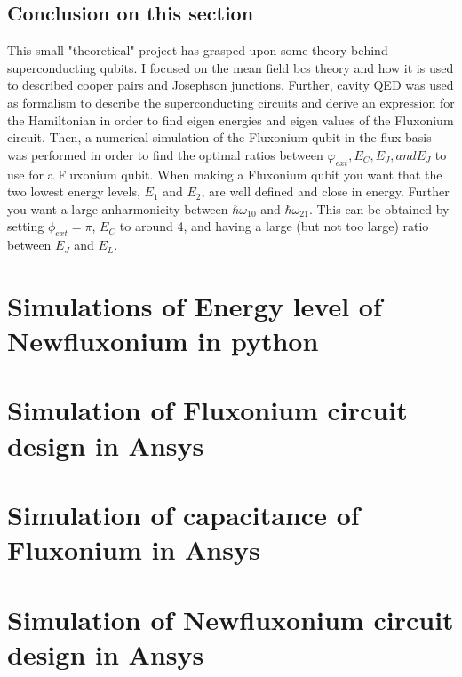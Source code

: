     \section{Conclusion on this section}
    This small "theoretical" project has grasped upon some theory behind superconducting qubits. I focused on the mean field \acrshort{bcs} theory and how it is used to described cooper pairs and Josephson junctions. Further, cavity QED was used as formalism to describe the superconducting circuits and derive an expression for the Hamiltonian in order to find eigen energies and eigen values of the Fluxonium circuit. Then, a numerical simulation of the Fluxonium qubit in the flux-basis was performed in order to find the optimal ratios between $\varphi_{ext}, E_C, E_J, and E_J$ to use for a Fluxonium qubit. When making a Fluxonium qubit you want that the two lowest energy levels, $E_1$ and $E_2$, are well defined and close in energy. Further you want a large anharmonicity between $\hbar \omega_{10}$ and $\hbar \omega_{21}$. This can be obtained by setting $\phi_{ext} = \pi$, $E_C $ to around 4, and having a large (but not too large) ratio between $E_J$ and $E_L$.


\chapter{Simulations of Energy level of Newfluxonium in python}
    

\chapter{Simulation of Fluxonium circuit design in Ansys}

\chapter{Simulation of capacitance of Fluxonium in Ansys}
    
\chapter{Simulation of Newfluxonium circuit design in Ansys}